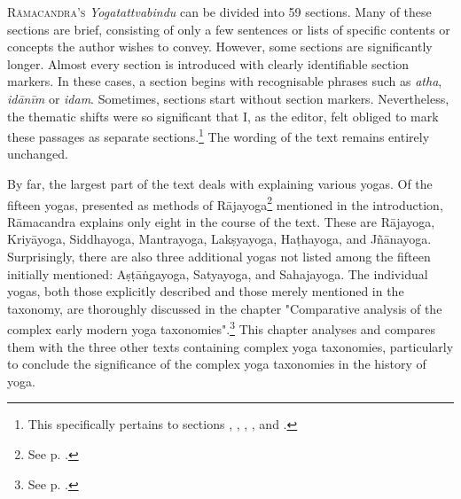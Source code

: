 \lettrine[lines=2, lhang=0.2, loversize=0.25]{R}{āmacandra's} \emph{Yogatattvabindu} can be divided into 59 sections. Many of these sections are brief, consisting of only a few sentences or lists of specific contents or concepts the author wishes to convey. However, some sections are significantly longer. Almost every section is introduced with clearly identifiable section markers. In these cases, a section begins with recognisable phrases such as \textit{atha}, \textit{idānīm} or \textit{idam}. Sometimes, sections start without section markers. Nevertheless, the thematic shifts were so significant that I, as the editor, felt obliged to mark these passages as separate sections.\footnote{This specifically pertains to sections , , , , and .} The wording of the text remains entirely unchanged.

By far, the largest part of the text deals with explaining various yogas. Of the fifteen yogas, presented as methods of Rājayoga\footnote{See p. \pageref{into}.} mentioned in the introduction, Rāmacandra explains only eight in the course of the text. These are Rājayoga, Kriyāyoga, Siddhayoga, Mantrayoga, Lakṣyayoga, Haṭhayoga, and Jñānayoga. Surprisingly, there are also three additional yogas not listed among the fifteen initially mentioned: Aṣṭāṅgayoga, Satyayoga, and Sahajayoga. The individual yogas, both those explicitly described and those merely mentioned in the taxonomy, are thoroughly discussed in the chapter "Comparative analysis of the complex early modern yoga taxonomies".\footnote{See p. \pageref{yogatax}.} This chapter analyses and compares them with the three other texts containing complex yoga taxonomies, particularly to conclude the significance of the complex yoga taxonomies in the history of yoga.

